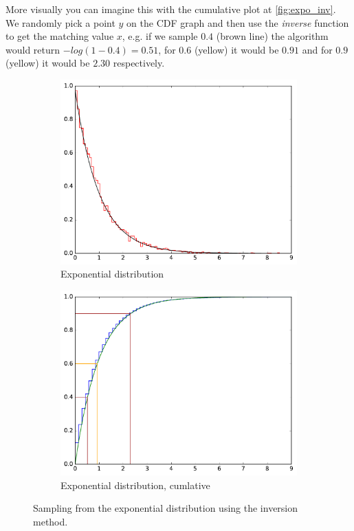 More visually you can imagine this with the cumulative plot at \autoref{fig:expo_inv}.
We randomly pick a point $y$ on the CDF graph and then use the \textit{inverse}
function to get the matching value $x$, e.g. if we sample $0.4$ (brown line) the algorithm
would return $-log(1 - 0.4) = 0.51$, for $0.6$ (yellow) it would be $0.91$ and for
$0.9$ (yellow) it would be $2.30$ respectively.

\begin{figure}
    \centering
    \begin{subfigure}[b]{0.49\textwidth}
        \includegraphics[width=\textwidth]{figs/expo.pdf}
        \caption{Exponential distribution}
    \end{subfigure}
    \begin{subfigure}[b]{0.49\textwidth}
        \includegraphics[width=\textwidth]{figs/inversion_sampling.pdf}
        \caption{Exponential distribution, cumlative}
    \end{subfigure}
    \caption{Sampling from the exponential distribution using the inversion method.}
     \label{fig:expo_inv}
\end{figure}

